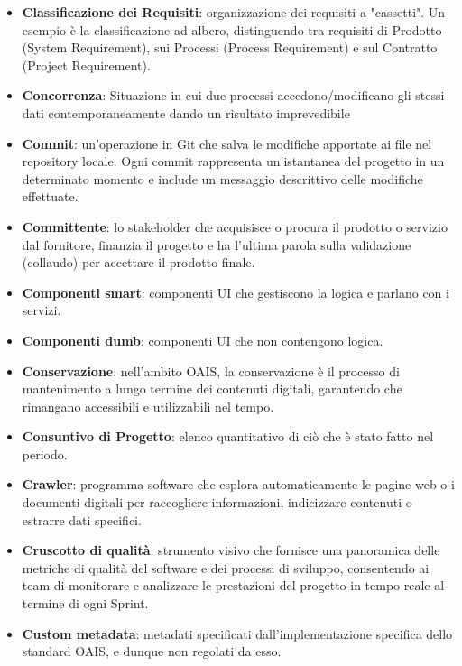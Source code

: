 \documentclass[a4paper,12pt]{article}
\begin{document}
\begin{itemize}
    \item \textbf{Classificazione dei Requisiti}: organizzazione dei requisiti a "cassetti". Un esempio è la classificazione ad albero, distinguendo tra requisiti di Prodotto (System Requirement), sui Processi (Process Requirement) e sul Contratto (Project Requirement).
    \item \textbf{Concorrenza}: Situazione in cui due processi accedono/modificano gli stessi dati contemporaneamente dando un risultato imprevedibile
    \item \textbf{Commit}: un'operazione in Git che salva le modifiche apportate ai file nel repository locale. Ogni commit rappresenta un'istantanea del progetto in un determinato momento e include un messaggio descrittivo delle modifiche effettuate.
    \item \textbf{Committente}: lo stakeholder che acquisisce o procura il prodotto o servizio dal fornitore, finanzia il progetto e ha l'ultima parola sulla validazione (collaudo) per accettare il prodotto finale.
    \item \textbf{Componenti smart}: componenti UI che gestiscono la logica e parlano con i servizi.
    \item \textbf{Componenti dumb}: componenti UI che non contengono logica. 
    \item \textbf{Conservazione}: nell'ambito OAIS, la conservazione è il processo di mantenimento a lungo termine dei contenuti digitali, garantendo che rimangano accessibili e utilizzabili nel tempo.
    \item \textbf{Consuntivo di Progetto}: elenco quantitativo di ciò che è stato fatto nel periodo.
    \item \textbf{Crawler}: programma software che esplora automaticamente le pagine web o i documenti digitali per raccogliere informazioni, indicizzare contenuti o estrarre dati specifici. 
    \item \textbf{Cruscotto di qualità}: strumento visivo che fornisce una panoramica delle metriche di qualità del software e dei processi di sviluppo, consentendo ai team di monitorare e analizzare le prestazioni del progetto in tempo reale al termine di ogni Sprint.
    \item \textbf{Custom metadata}: metadati specificati dall'implementazione specifica dello standard OAIS, e dunque non regolati da esso.
\end{itemize}
\end{document}
